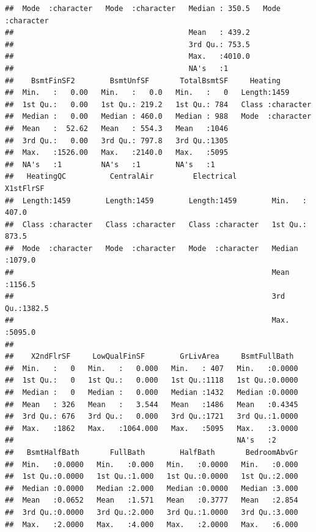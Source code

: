 \documentclass[
]{article}
\begin{document}
\begin{verbatim}
##  Mode  :character   Mode  :character   Median : 350.5   Mode  :character  
##                                        Mean   : 439.2                     
##                                        3rd Qu.: 753.5                     
##                                        Max.   :4010.0                     
##                                        NA's   :1                          
##    BsmtFinSF2        BsmtUnfSF       TotalBsmtSF     Heating         
##  Min.   :   0.00   Min.   :   0.0   Min.   :   0   Length:1459       
##  1st Qu.:   0.00   1st Qu.: 219.2   1st Qu.: 784   Class :character  
##  Median :   0.00   Median : 460.0   Median : 988   Mode  :character  
##  Mean   :  52.62   Mean   : 554.3   Mean   :1046                     
##  3rd Qu.:   0.00   3rd Qu.: 797.8   3rd Qu.:1305                     
##  Max.   :1526.00   Max.   :2140.0   Max.   :5095                     
##  NA's   :1         NA's   :1        NA's   :1                        
##   HeatingQC          CentralAir         Electrical          X1stFlrSF     
##  Length:1459        Length:1459        Length:1459        Min.   : 407.0  
##  Class :character   Class :character   Class :character   1st Qu.: 873.5  
##  Mode  :character   Mode  :character   Mode  :character   Median :1079.0  
##                                                           Mean   :1156.5  
##                                                           3rd Qu.:1382.5  
##                                                           Max.   :5095.0  
##                                                                           
##    X2ndFlrSF     LowQualFinSF        GrLivArea     BsmtFullBath   
##  Min.   :   0   Min.   :   0.000   Min.   : 407   Min.   :0.0000  
##  1st Qu.:   0   1st Qu.:   0.000   1st Qu.:1118   1st Qu.:0.0000  
##  Median :   0   Median :   0.000   Median :1432   Median :0.0000  
##  Mean   : 326   Mean   :   3.544   Mean   :1486   Mean   :0.4345  
##  3rd Qu.: 676   3rd Qu.:   0.000   3rd Qu.:1721   3rd Qu.:1.0000  
##  Max.   :1862   Max.   :1064.000   Max.   :5095   Max.   :3.0000  
##                                                   NA's   :2       
##   BsmtHalfBath       FullBath        HalfBath       BedroomAbvGr  
##  Min.   :0.0000   Min.   :0.000   Min.   :0.0000   Min.   :0.000  
##  1st Qu.:0.0000   1st Qu.:1.000   1st Qu.:0.0000   1st Qu.:2.000  
##  Median :0.0000   Median :2.000   Median :0.0000   Median :3.000  
##  Mean   :0.0652   Mean   :1.571   Mean   :0.3777   Mean   :2.854  
##  3rd Qu.:0.0000   3rd Qu.:2.000   3rd Qu.:1.0000   3rd Qu.:3.000  
##  Max.   :2.0000   Max.   :4.000   Max.   :2.0000   Max.   :6.000  

\end{verbatim}
\end{document}
